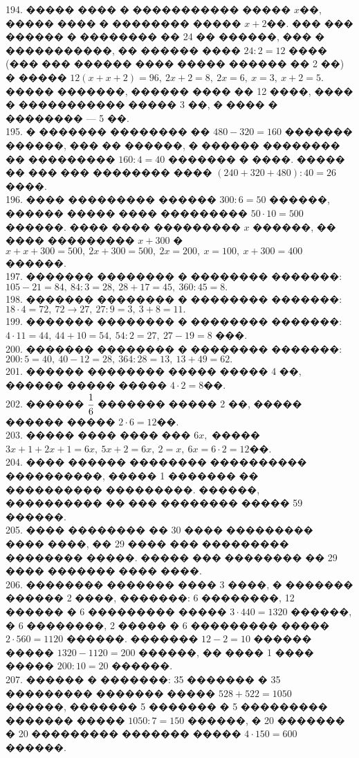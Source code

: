 \documentclass[12pt]{article}
\begin{document}
194. ����� ���� � ����������� ����� $x$��, ����� ���� � �������� ����� $x+2$��. ��� ��� ������ � �������� �� 24 �� ������, ��� � �����������, �� ������ ���� $24:2=12$ ���� (��� ��� ������ ���� ����� ������ �� 2 ��) � ����� $12(x+x+2)=96,\ 2x+2=8,\ 2x=6,\ x=3,\ x+2=5.$ ����� �������, ������ ���� �� 12 ����, ���� � ����������� ����� 3 ��, � ���� � �������� --- 5 ��.\\
195. � ������� �������� �� $480-320=160$ ������� ������, ��� �� ������, � ������ �������� �� ��������� $160:4=40$ ������� � ����. ����� �� ��� ��� �������� ���� $(240+320+480):40=26$ ����.\\
196. ���� ��������� ������ $300:6=50$ ������, ������ ����� ���� ��������� $50\cdot10=500$ ������. ���� ���� ��������� $x$ ������, �� ���� ��������� $x+300$ � $x+x+300=500,\ 2x+300=500,\ 2x=200,\ x=100,\ x+300=400$ ������.\\
197. ������� �������� � �������� �������: $105-21=84,\ 84:3=28,\ 28+17=45,\ 360:45=8.$\\
198. ������� �������� � �������� �������: $18\cdot4=72,\ 72\rightarrow27,\ 27:9=3,\ 3+8=11.$\\
199. ������� �������� � �������� �������: $4\cdot11=44,\ 44+10=54,\ 54:2=27,\ 27-19=8$ ���.\\
200. ������� �������� � �������� �������: $200:5=40,\ 40-12=28,\ 364:28=13,\ 13+49=62.$\\
201. ������ �������� ����� ����� 4 ��, ������ ����� ����� $4\cdot2=8$��.\\
202. ������ $\cfrac{1}{6}$ ������� ����� 2 ��, ����� ������ ����� $2\cdot6=12$��.\\
203. ����� ���� ���� ��� $6x,$ ����� $3x+1+2x+1=6x,\ 5x+2=6x,\ 2=x,\ 6x=6\cdot2=12$��.\\
204. ���� ������ �������� ���������� ����������, ����� 1 ������� �� ���������� ���������. ������, ���������� �� ��� �������� ����� 59 ������.\\
205. ���� �������� �� 30 ���� ��������� ���� ����, �� 29 ���� ��� ��������� �������� �����. ����� ��� �������� �� 29 ���� ������� ���� ����.\\
206. �������� ������� ���� 3 ����, � ������� ������ 2 ����, �������: 6 ��������, 12 ������ � 6 ��������� ����� $3\cdot440=1320$ ������, � 6 ��������, 2 ����� � 6 ��������� ����� $2\cdot560=1120$ ������. ������� $12-2=10$ ������ ����� $1320-1120=200$ ������, �� ���� 1 ���� ����� $200:10=20$ ������.\\
207. ������ � �������: 35 ������� � 35 ��������� ������� ����� $528+522=1050$ ������, ������� 5 ������� � 5 ��������� ������� ����� $1050:7=150$ ������, � 20 ������� � 20 ��������� ������� ����� $4\cdot150=600$ ������.\\
\end{document}
